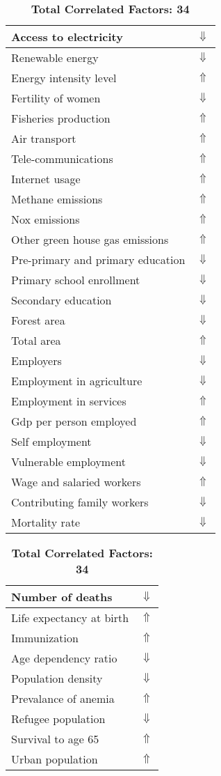 \documentclass[12pt,notitlepage,oneside]{report}
\begin{document}
\begin{table}[!htb]
\caption{\textbf{Shows Symptom: Shortness of breath $\Uparrow$}}
\centering
\label{Correlated Socio-economic Factors0}
\begin{tabular}{|l|l|}
\hline
Access to electricity & $\Downarrow$\\ \hline
Renewable energy & $\Downarrow$\\ \hline
Energy intensity level & $\Uparrow$\\ \hline
Fertility of women & $\Downarrow$\\ \hline
Fisheries production & $\Uparrow$\\ \hline
Air transport  & $\Uparrow$\\ \hline
Tele-communications & $\Uparrow$\\ \hline
Internet usage & $\Uparrow$\\ \hline
Methane emissions & $\Uparrow$\\ \hline
Nox emissions & $\Uparrow$\\ \hline
Other green house gas emissions & $\Uparrow$\\ \hline
Pre-primary and primary education & $\Downarrow$\\ \hline
Primary school enrollment & $\Downarrow$\\ \hline
Secondary education & $\Downarrow$\\ \hline
Forest area & $\Downarrow$\\ \hline
Total area & $\Uparrow$\\ \hline
Employers & $\Downarrow$\\ \hline
Employment in agriculture & $\Downarrow$\\ \hline
Employment in services & $\Uparrow$\\ \hline
Gdp per person employed & $\Uparrow$\\ \hline
Self employment & $\Downarrow$\\ \hline
Vulnerable employment & $\Downarrow$\\ \hline
Wage and salaried workers & $\Uparrow$\\ \hline
Contributing family workers & $\Downarrow$\\ \hline
Mortality rate & $\Downarrow$\\ \hline
\end{tabular}
\begin{tabular}{|l|l|}
\hline
Number of deaths & $\Downarrow$\\ \hline
Life expectancy at birth & $\Uparrow$\\ \hline
Immunization & $\Uparrow$\\ \hline
Age dependency ratio & $\Downarrow$\\ \hline
Population density & $\Downarrow$\\ \hline
Prevalance of anemia & $\Uparrow$\\ \hline
Refugee population & $\Downarrow$\\ \hline
Survival to age 65 & $\Uparrow$\\ \hline
Urban population & $\Uparrow$\\ \hline
\end{tabular}
\caption*{\textbf{Total Correlated Factors: 34}}
\end{table}
\end{document}
